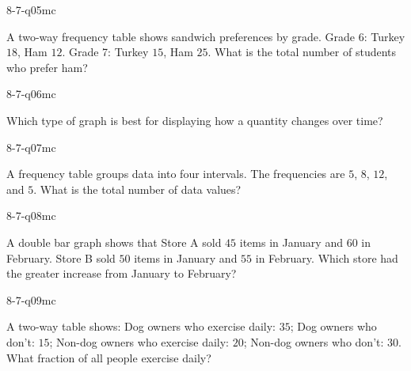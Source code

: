 \begin{practiceQuestion}{8-7-q05}{mc}
\begin{questionText}
A two-way frequency table shows sandwich preferences by grade. Grade 6: Turkey $18$, Ham $12$. Grade 7: Turkey $15$, Ham $25$. What is the total number of students who prefer ham?
\end{questionText}
\end{practiceQuestion}

\begin{practiceQuestion}{8-7-q06}{mc}
\begin{questionText}
Which type of graph is best for displaying how a quantity changes over time?
\end{questionText}
\end{practiceQuestion}

\begin{practiceQuestion}{8-7-q07}{mc}
\begin{questionText}
A frequency table groups data into four intervals. The frequencies are $5$, $8$, $12$, and $5$. What is the total number of data values?
\end{questionText}
\end{practiceQuestion}

\begin{practiceQuestion}{8-7-q08}{mc}
\begin{questionText}
A double bar graph shows that Store A sold $45$ items in January and $60$ in February. Store B sold $50$ items in January and $55$ in February. Which store had the greater increase from January to February?
\end{questionText}
\end{practiceQuestion}

\begin{practiceQuestion}{8-7-q09}{mc}
\begin{questionText}
A two-way table shows: Dog owners who exercise daily: $35$; Dog owners who don't: $15$; Non-dog owners who exercise daily: $20$; Non-dog owners who don't: $30$. What fraction of all people exercise daily?
\end{questionText}
\end{practiceQuestion}

